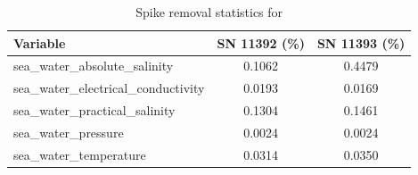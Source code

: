 \begin{table}[h]
\centering
\caption{Spike removal statistics for \projectname{} \casenumber{}}
\label{tab:spike_stats}
\begin{tabular}{|l|c|c|}
\hline
Variable & SN 11392 (\%) & SN 11393 (\%) \\
\hline
sea\_water\_absolute\_salinity & 0.1062 & 0.4479 \\
sea\_water\_electrical\_conductivity & 0.0193 & 0.0169 \\
sea\_water\_practical\_salinity & 0.1304 & 0.1461 \\
sea\_water\_pressure & 0.0024 & 0.0024 \\
sea\_water\_temperature & 0.0314 & 0.0350 \\
\hline
\end{tabular}
\end{table}

